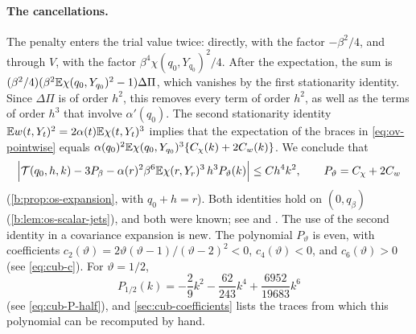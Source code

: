 \paragraph{The cancellations.} The penalty enters the trial value twice:
directly, with the factor $-\beta^2/4$, and through $V$, with the factor
$\beta^4\chi(q_0,Y_{q_0})^2/4$. After the expectation, the sum is
$(\beta^2/4)(\beta^2\mathbb E\chi(q_0,Y_{q_0})^2-1)\Delta\Pi$, which vanishes by the
first stationarity identity. Since $\Delta\Pi$ is of order $h^2$,
this removes every term of order $h^2$, as well as the terms of order $h^3$ that involve
$\alpha'(q_0)$. The second stationarity identity
$\mathbb E w(t,Y_t)^2=2\alpha(t)\mathbb E\chi(t,Y_t)^3$ implies that the expectation of the
braces in \eqref{eq:ov-pointwise} equals
$\alpha(q_0)^2\mathbb E\chi(q_0,Y_{q_0})^3\{C_\chi(k)+2C_w(k)\}$. We conclude that
\begin{equation}\label{eq:ov-expansion}
 \Bigl|\mathcal T(q_0,h,k)-3P_\beta
 -\alpha(r)^2\beta^6\mathbb E\chi(r,Y_r)^3\,h^3P_\vartheta(k)\Bigr|\le Ch^4k^2,
 \qquad P_\vartheta=C_\chi+2C_w
\end{equation}
(\cref{b:prop:os-expansion}, with $q_0+h=r$). Both identities hold on
$(0,q_\beta)$ (\cref{b:lem:os-scalar-jets}), and both were known; see
\cite[proof of Lemma~7.2]{quantitative-parisi} and \cite[Lemma~2.5]{full-rsb}.
The use of the second identity in a covariance expansion is new. The
polynomial $P_\vartheta$ is even, with coefficients
$c_2(\vartheta)=2\vartheta(\vartheta-1)/(\vartheta-2)^2<0$,
$c_4(\vartheta)<0$, and $c_6(\vartheta)>0$ (see \eqref{eq:cub-c}). For
$\vartheta=1/2$,
\[
 P_{1/2}(k)=-\frac29k^2-\frac{62}{243}k^4+\frac{6952}{19683}k^6
\]
(see \eqref{eq:cub-P-half}), and \cref{sec:cub-coefficients} lists the traces from
which this polynomial can be recomputed by hand.

